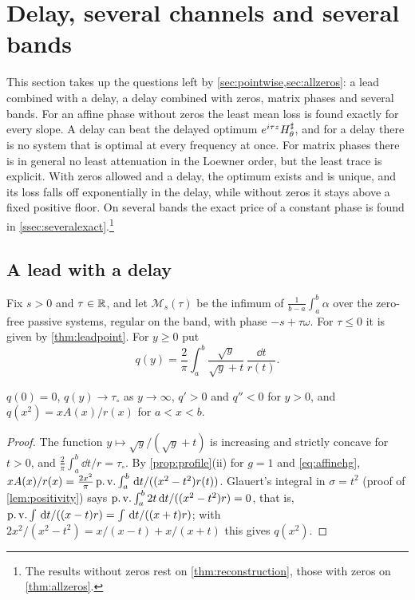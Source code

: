 \section{Delay, several channels and several bands}\label{sec:beyond}

This section takes up the questions left by
\cref{sec:pointwise,sec:allzeros}: a lead combined with a delay, a delay
combined with zeros, matrix phases and several bands. For an affine phase without zeros the least mean loss is found
exactly for every slope. A delay can beat the delayed optimum
$e^{i\tau z}H^{\sharp}_\theta$, and for a delay there is no system that is optimal at
every frequency at once. For matrix phases there is in general no least
attenuation in the Loewner order, but the least trace is explicit. With
zeros allowed and a delay, the optimum exists and is unique, and its loss
falls off exponentially in the delay, while without zeros it stays above a
fixed positive floor. On several bands the exact price of a constant phase
is found in \cref{ssec:severalexact}.\footnote{The results without zeros rest on
\cref{thm:reconstruction}, those with zeros on \cref{thm:allzeros}.}

\subsection{A lead with a delay}\label{ssec:exactmean}

Fix $s>0$ and $\tau\in\mathbb R$, and let $\mathcal M_s(\tau)$ be the infimum of
$\frac1{b-a}\int_a^b\alpha$ over the zero-free passive systems, regular on the
band, with phase $-s+\tau\omega$. For $\tau\le0$ it is given by
\cref{thm:leadpoint}. For $y\ge0$ put
\begin{equation}\label{eq:qdef}
q(y)=\frac2\pi\int_a^b\frac{\sqrt y}{\sqrt y+t}\,\frac{\dd t}{r(t)} .
\end{equation}

\begin{lemma}\label{lem:q}
$q(0)=0$, $q(y)\to\tau_\circ$ as $y\to\infty$, $q'>0$ and $q''<0$ for $y>0$,
and $q(x^2)=xA(x)/r(x)$ for $a<x<b$.
\end{lemma}

\begin{proof}
The function $y\mapsto\sqrt y/(\sqrt y+t)$ is increasing and strictly concave
for $t>0$, and $\frac2\pi\int_a^b\dd t/r=\tau_\circ$. By
\cref{prop:profile}(ii) for $g=1$ and \eqref{eq:affinehg},
$xA(x)/r(x)=\frac{2x^2}\pi\operatorname{p.v.}\int_a^b\,\mathrm d t/((x^2-t^2)r(t))$. Glauert's
integral in $\sigma=t^2$ (proof of \cref{lem:positivity}) says
$\operatorname{p.v.}\int_a^b2t\,\mathrm d t/((x^2-t^2)r)=0$, that is,
$\operatorname{p.v.}\int\,\mathrm d t/((x-t)r)=\int\,\mathrm d t/((x+t)r)$; with
$2x^2/(x^2-t^2)=x/(x-t)+x/(x+t)$ this gives $q(x^2)$.
\end{proof}

